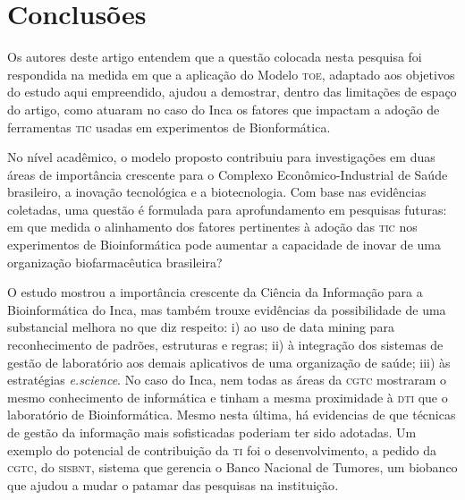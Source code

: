 \documentclass{article}
\begin{document}
\section{Conclusões}

Os autores deste artigo entendem que a questão colocada nesta pesquisa foi
respondida na medida em que a aplicação do Modelo \textsc{toe}, adaptado aos objetivos do
estudo aqui empreendido, ajudou a demostrar, dentro das limitações de espaço do
artigo, como atuaram no caso do Inca os fatores que impactam a adoção de
ferramentas \textsc{tic} usadas em experimentos de Bionformática.

No nível acadêmico, o modelo proposto contribuiu para investigações em duas
áreas de importância crescente para o Complexo Econômico-Industrial de Saúde
brasileiro, a inovação tecnológica e a biotecnologia. Com base nas evidências
coletadas, uma questão é formulada para aprofundamento em pesquisas futuras: em
que medida o alinhamento dos fatores pertinentes à adoção das \textsc{tic} nos
experimentos de Bioinformática pode aumentar a capacidade de inovar de uma
organização biofarmacêutica brasileira?

O estudo mostrou a importância crescente da Ciência da Informação para a
Bioinformática do Inca, mas também trouxe evidências da possibilidade de uma
substancial melhora no que diz respeito: i) ao uso de data mining para
reconhecimento de padrões, estruturas e regras; ii) à integração dos sistemas de
gestão de laboratório aos demais aplicativos de uma organização de saúde; iii)
às estratégias \textit{e.science}. No caso do Inca, nem todas as áreas da \textsc{cgtc} mostraram o mesmo conhecimento de
informática e tinham a mesma proximidade à \textsc{dti} que o laboratório de
Bioinformática. Mesmo nesta última, há evidencias de que técnicas de gestão da
informação mais sofisticadas poderiam ter sido adotadas. Um exemplo do potencial
de contribuição da \textsc{ti} foi o desenvolvimento, a pedido da \textsc{cgtc}, do \textsc{sisbnt},
sistema que gerencia o Banco Nacional de Tumores, um biobanco que ajudou a mudar
o patamar das pesquisas na instituição\textit{.}
\end{document}

